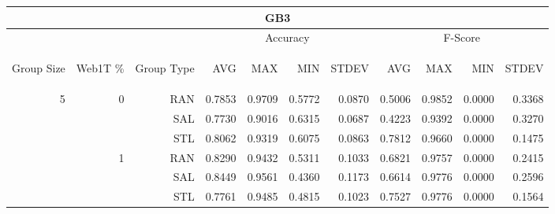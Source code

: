 \begin{center}
\begin{table}[htbp]
\begin{tabular}{ | r | r | r | r | r | r | r | r | r | r | r |}
\hline
\multicolumn{11}{|c|}{GB3}\\
\hline
 & & & \multicolumn{4}{|c|}{Accuracy} & \multicolumn{4}{|c|}{F-Score}\\ \cline{4-11}
\begin{sideways}Group Size\end{sideways} & \begin{sideways}Web1T \%\end{sideways} & \begin{sideways}Group Type\end{sideways} & \begin{sideways}AVG\end{sideways} & \begin{sideways}MAX\end{sideways} & \begin{sideways}MIN\end{sideways} & \begin{sideways}STDEV\end{sideways} & \begin{sideways}AVG\end{sideways} & \begin{sideways}MAX\end{sideways} & \begin{sideways}MIN\end{sideways} & \begin{sideways}STDEV\end{sideways}\\
\hline
\multirow{18}{*}{5}
 & \multirow{3}{*}{0} & RAN & 0.7853 & 0.9709 & 0.5772 & 0.0870 & 0.5006 & 0.9852 & 0.0000 & 0.3368\\ \cline{3-11}
 &   & SAL & 0.7730 & 0.9016 & 0.6315 & 0.0687 & 0.4223 & 0.9392 & 0.0000 & 0.3270\\ \cline{3-11}
 &   & STL & 0.8062 & 0.9319 & 0.6075 & 0.0863 & 0.7812 & 0.9660 & 0.0000 & 0.1475\\ \cline{2-11}
 & \multirow{3}{*}{1} & RAN & 0.8290 & 0.9432 & 0.5311 & 0.1033 & 0.6821 & 0.9757 & 0.0000 & 0.2415\\ \cline{3-11}
 &   & SAL & 0.8449 & 0.9561 & 0.4360 & 0.1173 & 0.6614 & 0.9776 & 0.0000 & 0.2596\\ \cline{3-11}
 &   & STL & 0.7761 & 0.9485 & 0.4815 & 0.1023 & 0.7527 & 0.9776 & 0.0000 & 0.1564\\ \cline{2-11}

\end{tabular}
\end{table}
\end{center}
